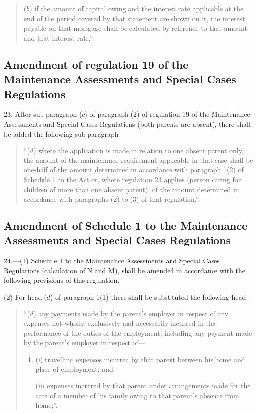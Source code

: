 \documentclass[a4paper]{article}
\begin{document}
\begin{quotation}
\begin{enumerate}
($b$) if the amount of capital owing and the interest rate applicable at the end of the period covered by that statement are shown on it, the interest payable on that mortgage shall be calculated by reference to that amount and that interest rate.”
\end{enumerate}
\end{quotation}

\subsection[23. Amendment of regulation 19 of the Maintenance Assessments and Special Cases Regulations]{Amendment of regulation 19 of the Maintenance Assessments and Special Cases Regulations}

23.  After sub-paragraph ($c$) of paragraph (2) of regulation 19 of the Maintenance Assessments and Special Cases Regulations (both parents are absent), there shall be added the following sub-paragraph—
\begin{quotation}
“($d$) where the application is made in relation to one absent parent only, the amount of the maintenance requirement applicable in that case shall be one-half of the amount determined in accordance with paragraph 1(2) of Schedule 1 to the Act or, where regulation 23 applies (person caring for children of more than one absent parent), of the amount determined in accordance with paragraphs (2) to (3) of that regulation.”.
\end{quotation}

\subsection[24. Amendment of Schedule 1 to the Maintenance Assessments and Special Cases Regulations]{Amendment of Schedule 1 to the Maintenance Assessments and Special Cases Regulations}

24.—(1) Schedule 1 to the Maintenance Assessments and Special Cases Regulations (calculation of N and M), shall be amended in accordance with the following provisions of this regulation.

(2) For head ($d$) of paragraph 1(1) there shall be substituted the following head—
\begin{quotation}
“($d$) any payments made by the parent’s employer in respect of any expenses not wholly, exclusively and necessarily incurred in the performance of the duties of the employment, including any payment made by the parent’s employer in respect of—
\begin{enumerate}\item[]
(i) travelling expenses incurred by that parent between his home and place of employment; and

(ii) expenses incurred by that parent under arrangements made for the care of a member of his family owing to that parent’s absence from home;”.
\end{enumerate}
\end{quotation}
\end{document}
